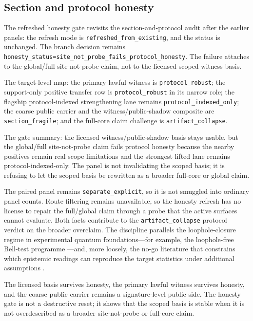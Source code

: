 \documentclass[11pt]{article}
\theoremstyle{definition}
\begin{document}
\subsection{Section and protocol honesty}

The refreshed honesty gate revisits the section-and-protocol audit after the earlier
panels: the refresh mode is \texttt{refreshed\_from\_existing}, and the status is
unchanged. The branch decision remains
\texttt{honesty\_status=site\_not\_probe\_fails\_protocol\_honesty}. The failure
attaches to the global/full site-not-probe claim, not to the licensed scoped witness
basis.

The target-level map: the primary lawful witness is \texttt{protocol\_robust}; the
support-only positive transfer row is \texttt{protocol\_robust} in its narrow role; the
flagship protocol-indexed strengthening lane remains \texttt{protocol\_indexed\_only};
the coarse public carrier and the witness/public-shadow composite are
\texttt{section\_fragile}; and the full-core claim challenge is
\texttt{artifact\_collapse}.

The gate summary: the licensed witness/public-shadow basis stays usable, but the
global/full site-not-probe claim fails protocol honesty because the nearby positives
remain real scope limitations and the strongest lifted lane remains
protocol-indexed-only. The panel is not invalidating the scoped basis; it is refusing
to let the scoped basis be rewritten as a broader full-core or global claim.

The paired panel remains \texttt{separate\_explicit}, so it is not smuggled into
ordinary panel counts. Route filtering remains unavailable, so the honesty refresh has
no license to repair the full/global claim through a probe that the active surfaces
cannot evaluate. Both facts contribute to the \texttt{artifact\_collapse} protocol
verdict on the broader overclaim. The discipline parallels the loophole-closure
regime in experimental quantum foundations---for example, the loophole-free
Bell-test programme \citep{Hensen2015}---and, more loosely, the no-go literature
that constrains which epistemic readings can reproduce the target statistics under
additional assumptions \citep{PuseyBarrettRudolph2012}.

The licensed basis survives honesty, the primary lawful witness survives honesty, and
the coarse public carrier remains a signature-level public side. The honesty gate is
not a destructive reset; it shows that the scoped basis is stable when it is not
overdescribed as a broader site-not-probe or full-core claim.
\end{document}
